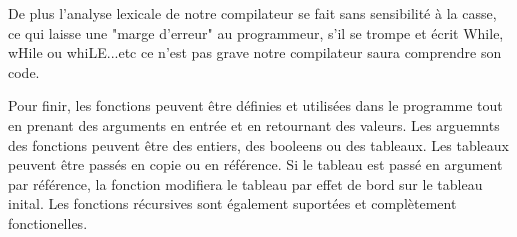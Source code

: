 \documentclass[a4paper]{article}
\begin{document}
De plus l'analyse lexicale de notre compilateur se fait sans sensibilité à la casse, ce qui laisse une "marge d'erreur" au programmeur, s'il se trompe et écrit While, wHile ou whiLE...etc ce n'est pas grave notre compilateur saura comprendre son code.

Pour finir, les fonctions peuvent être définies et utilisées dans le programme tout en prenant des arguments en entrée et en retournant des valeurs.
Les arguemnts des fonctions peuvent être des entiers, des booleens ou des tableaux. Les tableaux peuvent être passés en copie ou en référence. Si le tableau est passé en argument par référence, la fonction modifiera le tableau par effet de bord sur le tableau inital. Les fonctions récursives sont également suportées et complètement fonctionelles.
\end{document}
